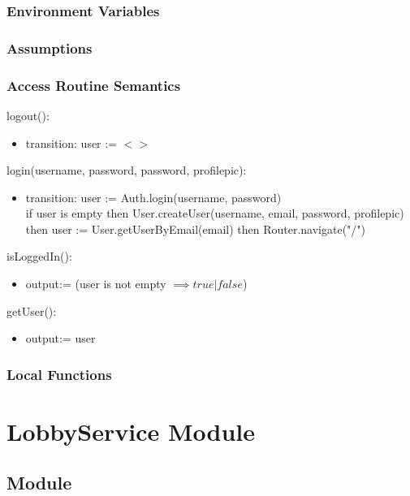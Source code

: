 \documentclass[12pt, titlepage]{article}
\begin{document}
\subsubsection{Environment Variables}

\subsubsection{Assumptions}

\subsubsection{Access Routine Semantics}

\noindent logout():
\begin{itemize}
\item transition: user := $<>$\\
\end{itemize}

\noindent login(username, password, password, profilepic):
\begin{itemize}
\item transition: user := Auth.login(username, password)\\
if user is empty then User.createUser(username, email, password, profilepic) then user := User.getUserByEmail(email) then Router.navigate("/")
\end{itemize}

\noindent isLoggedIn():
\begin{itemize} 
\item output:= (user is not empty $\implies true | false$)
\end{itemize}

\noindent getUser():
\begin{itemize}
\item output:= user
\end{itemize}

\subsubsection{Local Functions}

\newpage


\section{LobbyService Module} \label{LobbyService} 

\subsection{Module}
\end{document}
